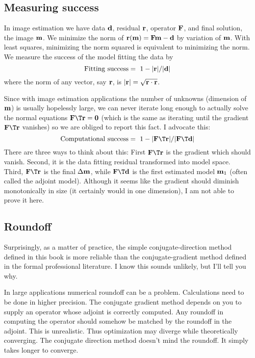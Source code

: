 \subsection{Measuring success}
In image estimation we have data $\bold d$, residual $\bold r$, operator $\bold F$,
and final solution, the image $\bold m$.
We minimize the norm of $\bold r(\bold m) = \bold F\bold m-\bold d$
by variation of $\bold m$.
With least squares, minimizing the norm squared is equivalent to minimizing the norm.
We measure the success of the model fitting the data by
\begin{equation}
\label{eqn:datafit}
{\rm Fitting~success} = \ 1 - |\bold r|/|\bold d|
\end{equation}
where the norm of any vector, say $\bold r$, is $|\bold r|=\sqrt{\bold r \cdot \bold r}$.
\par
Since with image estimation applications
the number of unknowns (dimension of $\bold m$) is usually hopelessly large,
we can never iterate long enough to actually solve
the normal equations $\bold F\T \bold r=\bold 0$
(which is the same as iterating until the gradient $\bold F\T\bold r$ vanishes)
so we are obliged to report this fact.  I advocate this:
\begin{equation}
\label{eqn:modelfit}
{\rm Computational~success} = \ 1 - |\bold F\T\bold r|/|\bold F\T\bold d|
\end{equation}
There are three ways to think about this:
First $\bold F\T\bold r$ is the gradient which should vanish.
Second, it is the data fitting residual transformed into model space.
Third, $\bold F\T\bold r$ is the final $\Delta \bold m$, while
$\bold F\T\bold d$ is the first estimated model $\bold m_1$ (often called the adjoint model).
Although it seems like the gradient should diminish monotonically in size
(it certainly would in one dimension), I am not able to prove it here.

\subsection{Roundoff}

Surprisingly, as a matter of practice, the simple conjugate-direction method
defined in this book is more reliable than the conjugate-gradient method
defined in the formal professional literature.
I know this sounds unlikely, but I'll tell you why.

\par
In large applications numerical roundoff can be a problem. 
Calculations need to be done in higher precision.
The conjugate gradient method depends on you to supply an operator
whose adjoint is correctly computed.
Any roundoff in computing the operator should somehow be matched
by the roundoff in the adjoint.   This is unrealistic.
Thus optimization may diverge while theoretically converging.
The conjugate direction method doesn't mind the roundoff.
It simply takes longer to converge.

